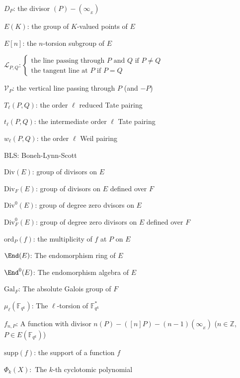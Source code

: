 \documentclass[a4paper, 11pt]{scrreprt}
\numberwithin{equation}{section}
\newcommand{\bz}{\mathbb Z}
\newcommand{\bFqk}{\mathbb{F}_{q^k}}
\newcommand{\absf}{\mathrm{Gal}_F}
\newcommand{\mc}{\mathcal}
\newcommand{\mr}{\mathrm}
\newcommand{\noin}{\noindent}
\theoremstyle{plain}
\begin{document}
\noin $D_P$: the divisor $(P)-(\infty_{_E})$ \vspace{2mm}

\noin $E(K)$: the group of $K$-valued points of $E$ \vspace{2mm}

\noin $E[n]$: the $n$-torsion subgroup of $E$ \vspace{2mm}

\noin $\mc{L}_{P,Q}: \begin{cases} \text{the line passing through } P \text{ and } Q \text{ if } P\neq Q\\ \text{the tangent line at } P \text{ if } P = Q \end{cases}$\vspace{2mm}

\noin $\mc{V}_{P}$: the vertical line passing through $P$ (and $-P$) \vspace{2mm}

\noin $T_{\ell}(P,Q)$: the order $\ell$ reduced Tate pairing \vspace{2mm}

\noin $t_{\ell}(P,Q)$: the intermediate order $\ell$ Tate pairing \vspace{2mm}

\noin $w_{\ell}(P,Q)$: the order $\ell$ Weil pairing  \vspace{2mm}

\noin BLS: Boneh-Lynn-Scott \vspace{2mm}

\noin $\mr{Div}(E)$: group of divisors on $E$ \vspace{2mm}

\noin $\mr{Div}_F(E)$: group of divisors on $E$ defined over $F$ \vspace{2mm}

\noin $\mr{Div}^0(E)$: group of degree zero dvisors on $E$ \vspace{2mm}

\noin $\mr{Div}^0_F(E)$: group of degree zero divisors on $E$ defined over $F$ \vspace{2mm}

\noin $\mr{ord}_P(f)$: the multiplicity of $f$ at $P$ on $E$ \vspace{2mm}

\noin $\End(E)$: The endomorphism ring of $E$  \vspace{2mm}

\noin $\End^0(E)$: The endomorphism algebra of $E$ \vspace{2mm}

\noin $\absf$: The absolute Galois group of $F$ \vspace{2mm}

\noin $\mu_{\ell}(\bFqk)$: The $\ell$-torsion of $\bFqk^*$ \vspace{2mm}

\noin $f_{n,P}$: A function with divisor $n(P)-([n]P)- (n-1)(\infty_{_E})$ \hspace{2mm} ($n\in \bz$, $P\in E(\bFqk)$) \vspace{2mm}

\noin $\mr{supp}(f)$: the support of a function $f$ \vspace{2mm}

\noin $\Phi_k(X):$ The $k$-th cyclotomic polynomial
\end{document}
